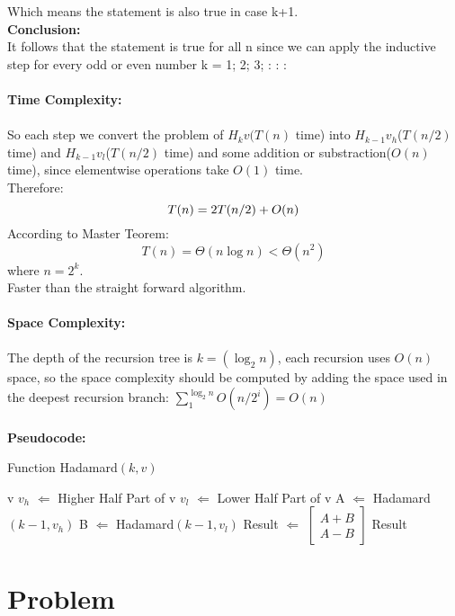 \documentclass{article}
\begin{document}
Which means the statement is also true in case k+1.\\
\textbf{Conclusion:}\\
It follows that the statement is true for all n since we can apply the inductive step for every odd or even number k = 1; 2; 3; : : :\\\\
\textbf{\large Time Complexity:}\\\\
So each step we convert the problem of $H_{k}v$$(T(n)$ time) into $H_{k-1}v_{h}$($T(n/2)$ time) and $H_{k-1}v_{l}$($T(n/2)$ time) and some addition or substraction($O(n)$ time), since elementwise operations take $O(1)$ time.\\
Therefore:
$$
T(n)=2T(n/2)+O(n)\\
$$
According to Master Teorem:
$$
T(n)=\Theta (n\log n)<\Theta (n^2)
$$
where $n=2^k$.\\
Faster than the straight forward algorithm.\\\\
\textbf{\large Space Complexity:}\\\\
The depth of the recursion tree is $k=(\log_2{n})$, each recursion uses $O(n)$ space, so the space complexity should be computed by adding the space used in the deepest recursion branch: $\sum_{1}^{\log_2 n} O(n/{2^i})=O(n)$\\\\
\textbf{\large Pseudocode:}
\begin{algorithm}
  \caption{Function Hadamard$(k,v)$}
  \label{alg1}
  \begin{algorithmic}
  \RETURN v
  \ENDIF
  \STATE $v_h$ $\Longleftarrow$ Higher Half Part of v
  \STATE $v_l$ $\Longleftarrow$ Lower Half Part of v
  \STATE A $\Longleftarrow$ Hadamard$(k-1,v_h)$
  \STATE B $\Longleftarrow$ Hadamard$(k-1,v_l)$
  \STATE Result $\Longleftarrow$ $\begin{bmatrix}
  A+B\\
  A-B
  \end{bmatrix}$
  \RETURN Result
  \end{algorithmic}
\end{algorithm}




\section{Problem \uppercase\expandafter{}}
\end{document}
